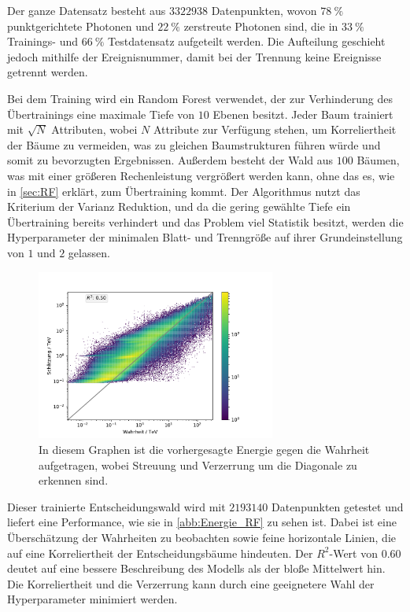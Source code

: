 Der ganze Datensatz besteht aus $\num{3322938}$ Datenpunkten, wovon $\SI{78}{\percent}$ punktgerichtete Photonen und $\SI{22}{\percent}$ zerstreute Photonen sind,
die in $\SI{33}{\percent}$ Trainings- und $\SI{66}{\percent}$ Testdatensatz aufgeteilt werden.
Die Aufteilung geschieht jedoch mithilfe der Ereignisnummer, damit bei der Trennung keine Ereignisse getrennt werden.

Bei dem Training wird ein Random Forest verwendet, der zur Verhinderung des Übertrainings eine maximale Tiefe von $10$ Ebenen besitzt.
Jeder Baum trainiert mit $\sqrt{N}$ Attributen, wobei $N$ Attribute zur Verfügung stehen, um Korreliertheit der Bäume zu vermeiden,
was zu gleichen Baumstrukturen führen würde und somit zu bevorzugten Ergebnissen.
Außerdem besteht der Wald aus $100$ Bäumen, was mit einer größeren Rechenleistung vergrößert werden kann, ohne
das es, wie in \autoref{sec:RF} erklärt, zum Übertraining kommt.
Der Algorithmus nutzt das Kriterium der Varianz Reduktion, und da die gering gewählte Tiefe
ein Übertraining bereits verhindert und das Problem viel Statistik besitzt, werden die Hyperparameter
der minimalen Blatt- und Trenngröße auf ihrer Grundeinstellung von $1$ und $2$ gelassen.

\begin{figure}
  \includegraphics[width=0.7\textwidth]{Plots/RF.pdf}
  \centering
  \caption{In diesem Graphen ist die vorhergesagte Energie gegen die Wahrheit aufgetragen, wobei Streuung und Verzerrung um die
          Diagonale zu erkennen sind.}
  \label{abb:Energie_RF}
\end{figure}
Dieser trainierte Entscheidungswald wird mit $\num{2193140}$ Datenpunkten getestet und liefert eine Performance, wie sie in \autoref{abb:Energie_RF} zu sehen ist.
Dabei ist eine Überschätzung der Wahrheiten zu beobachten sowie feine horizontale Linien, die auf eine Korreliertheit der Entscheidungsbäume hindeuten.
Der $R^2$-Wert von $\num{0.60}$ deutet auf eine bessere Beschreibung des Modells als der bloße Mittelwert hin.
Die Korreliertheit und die Verzerrung kann durch eine geeignetere Wahl der Hyperparameter minimiert werden.

